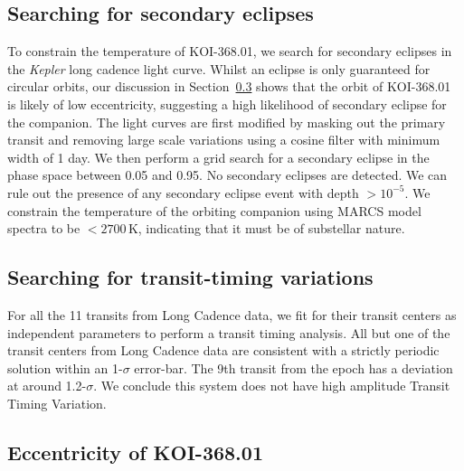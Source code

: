 \documentclass[iop]{emulateapj}
\begin{document}
\subsection{Searching for secondary eclipses}
\label{sec:nature-companion}

To constrain the temperature of KOI-368.01, we search for secondary eclipses in 
the \emph{Kepler} long cadence light curve. Whilst an eclipse is only guaranteed 
for circular orbits, our discussion in Section~\ref{sec:system-eccentricity} shows that the orbit of KOI-368.01 is
likely of low eccentricity, suggesting a high likelihood of secondary eclipse for the companion.
The light curves are first modified 
by masking out the primary transit and removing large scale variations using a 
cosine filter with minimum width of 1 day. We then perform a grid
search for a secondary eclipse in the phase space between 0.05 and
0.95. No secondary eclipses are detected. We can rule out the presence of any 
secondary eclipse event with depth $>10^{-5}$. We constrain the
temperature of the orbiting companion using MARCS model spectra \citep{Gustafsson:2008} 
to be $< 2700\,\text{K}$, indicating that it must be of substellar nature.

\subsection{Searching for transit-timing variations}
\label{sec:ttv}

For all the 11 transits from Long Cadence data, we fit for their transit 
centers as independent parameters to perform a transit timing analysis. 
All but one of the transit centers from Long Cadence data are consistent with a strictly 
periodic solution within an 1-$\sigma$ error-bar. 
The 9th transit from the epoch has a deviation at 
around 1.2-$\sigma$.
We conclude this system does not have high amplitude Transit Timing Variation. 


\subsection{Eccentricity of KOI-368.01}
\label{sec:system-eccentricity}
\end{document}
